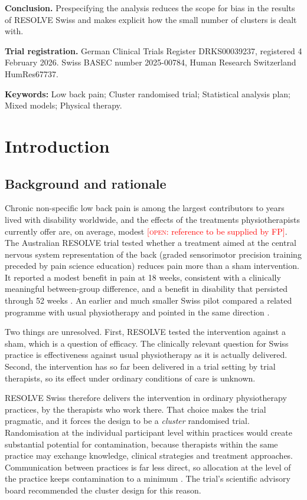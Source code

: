 \documentclass[11pt,a4paper]{article}
\newcommand{\open}[1]{\textcolor{red}{[\textsc{open}: #1]}}
\begin{document}
\textbf{Conclusion.} Prespecifying the analysis reduces the scope for bias in
the results of RESOLVE Swiss and makes explicit how the small number of
clusters is dealt with.

\textbf{Trial registration.} German Clinical Trials Register DRKS00039237,
registered 4 February 2026. Swiss BASEC number 2025-00784, Human Research
Switzerland HumRes67737.

\vspace{0.4em}
\noindent\textbf{Keywords:} Low back pain; Cluster randomised trial;
Statistical analysis plan; Mixed models; Physical therapy.

\section{Introduction}

\subsection{Background and rationale}

Chronic non-specific low back pain is among the largest contributors to years
lived with
disability worldwide, and the effects of the treatments physiotherapists
currently offer are, on average, modest \open{reference to be supplied by
FP}. The Australian RESOLVE trial tested
whether a treatment aimed at the central nervous system representation of the
back (graded sensorimotor precision training preceded by pain science
education) reduces pain more than a sham intervention. It reported a modest
benefit in pain at 18 weeks, consistent with a clinically meaningful
between-group difference, and a benefit in disability that persisted through
52 weeks \citep{bagg2022}. An earlier and much
smaller Swiss pilot compared a related programme with usual physiotherapy and
pointed in the same direction \citep{waelti2015}.

Two things are unresolved. First, RESOLVE tested the intervention against a
sham, which is a question of efficacy. The clinically relevant question for
Swiss practice is effectiveness against usual physiotherapy as it is actually
delivered. Second, the intervention has so far been delivered in a trial
setting by trial therapists, so its effect under ordinary conditions of care
is unknown.

RESOLVE Swiss therefore delivers the intervention in ordinary physiotherapy
practices, by the therapists who work there. That choice makes the trial
pragmatic, and it forces the design to be a \emph{cluster} randomised trial.
Randomisation at the individual participant level within practices would create
substantial potential for contamination, because therapists within the same
practice may exchange knowledge, clinical strategies and treatment
approaches.
Communication between practices is far less direct, so allocation at the
level of the practice keeps contamination to a minimum
\citep{hemming2021, campbell2012}. The trial's scientific advisory board
recommended the cluster design for this reason.
\end{document}
